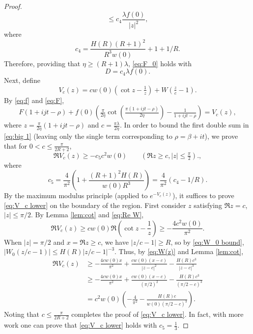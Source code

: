 \documentclass[10pt]{amsart}
\theoremstyle{remark}
\theoremstyle{plain}
\numberwithin{equation}{section}
\theoremstyle{definition}
\def\({\left(}
\def\){\right)}
\def\lam{\lambda}
\newcommand{\be}{\begin{equation}}
\begin{document}
\begin{proof}
$$\le c_4 \frac{\lam f(0)}{|z|^2},
$$
where
\be
c_4 = \frac{H(R) (R+1)^2}{R^3 w(0)} + 1 + 1/R.
\label{eq:c4}
\end{equation}
Therefore, providing that $\eta \ge (R+1)\lam$, \eqref{eq:F_0} holds  with
\begin{equation}
D = c_4 \lam f(0). \label{eq:D}
\end{equation}
Next, define
$$
V_c(z) = c w(0) \( \cot z - \tfrac1{z} \) + W\( \tfrac{z}{c}-1 \).
$$
By \eqref{eq:f} and \eqref{eq:F},
$$
 F(1+ijt-\rho) + f(0) \( \tfrac{\pi}{2\eta} \cot\(
  \tfrac{\pi(1+ijt-\rho)}{2\eta}\) -\tfrac{1}{1+ijt-\rho} \) = V_c(z),
$$
where $z=\frac{\pi}{2\eta}(1+ijt-\rho)$ and $c=\frac{\pi\lam}{2\eta}$.
In order to bound the first double sum in \eqref{eq:big 1}
(leaving only the single term corresponding to
$\rho=\beta+it$), we prove that for $0<c\le \frac{\pi}{2R+2}$,
\begin{equation}
\Re V_c(z) \ge - c_5 c^2 w(0) \qquad 
\(\Re z \ge c, |z| \le \tfrac{\pi}{2}\).,
\label{eq:V_c lower}
\end{equation}
where
\be
c_5 = \frac{4}{\pi^2} \( 1 + \frac{(R+1)^2 H(R)}{w(0) R^3} \) = 
\frac{4}{\pi^2} (c_4 - 1/R).
\label{eq:c5}
\end{equation}
By the maximum modulus principle (applied
to $e^{-V_c(z)}$), it suffices to prove \eqref{eq:V_c lower}
on the boundary of the region.  First consider $z$ satisfying
$\Re z = c$, $|z| \le \pi/2$.  By Lemma \ref{lem:cot} and \eqref{eq:Re W},
$$
\Re V_c(z) \ge c w(0) \Re \( \cot z - \frac{1}{z} \) \ge - \frac{4c^2w(0)}
{\pi^2}.
$$
When $|z|=\pi/2$ and $x=\Re z \ge c$, we have $|z/c-1| \ge R$, so
by \eqref{eq:W_0 bound}, $|W_0(z/c-1)| \le H(R) |z/c-1|^{-3}$.  Thus,
by \eqref{eq:W(z)} and Lemma \ref{lem:cot},
\begin{align*}
\Re V_c(z) &\ge -\frac{4cw(0) x}{\pi^2} + \frac{cw(0)(x-c)}{|z-c|^2} -
\frac{H(R) c^3}{|z-c|^3} \\
&\ge -\frac{4cw(0) x}{\pi^2} + \frac{cw(0)(x-c)}{(\pi/2)^2} -
\frac{H(R) c^3}{(\pi/2-c)^3} \\
&= c^2 w(0) \( -\frac{4}{\pi^2} - \frac{H(R) c}{w(0)(\pi/2-c)^3}\).
\end{align*}
Noting that $c\le \frac{\pi}{2R+2}$ completes the proof of
\eqref{eq:V_c lower}.
In fact, with more work one can prove that \eqref{eq:V_c lower}
 holds with $c_5=\frac13$.


\end{proof}
\end{document}
